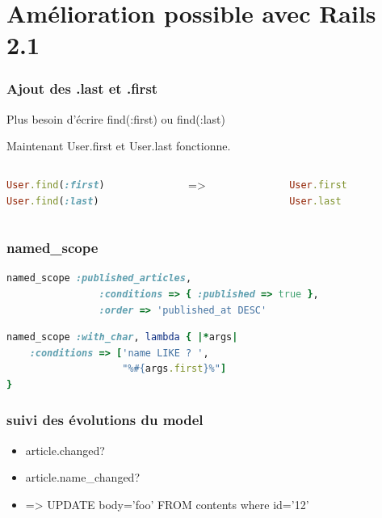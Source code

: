 \documentclass{beamer}
\begin{document}
\section{Amélioration possible avec Rails 2.1}

\begin{frame}[fragile]
    \frametitle{Ajout des .last et .first}
    Plus besoin d'écrire find(:first) ou find(:last) 

    Maintenant User.first et User.last fonctionne.

    \begin{columns}
        \begin{column}[l]{4cm}
            \begin{lstlisting}[language=Ruby]
User.find(:first)
User.find(:last)
            \end{lstlisting}
        \end{column}
        \begin{column}[c]{1cm}
        =>
        \end{column}
        \begin{column}[r]{4cm}
            \begin{lstlisting}[language=Ruby]
User.first
User.last
            \end{lstlisting}
        \end{column}
    \end{columns}
\end{frame}

\begin{frame}[fragile]
    \frametitle{named\_scope}
            \begin{lstlisting}[language=Ruby,showstringspaces=false]
named_scope :published_articles, 
                :conditions => { :published => true }, 
                :order => 'published_at DESC'
            \end{lstlisting}
            \begin{lstlisting}[language=Ruby,showstringspaces=false]
named_scope :with_char, lambda { |*args| 
    :conditions => ['name LIKE ? ', 
                    "%#{args.first}%"]
}
            \end{lstlisting}
\end{frame}

\begin{frame}
    \frametitle{suivi des évolutions du model}
    \begin{itemize}
        \item article.changed?
        \item article.name\_changed?
        \item => UPDATE body='foo' FROM contents where id='12'
    \end{itemize}
\end{frame}
\end{document}
